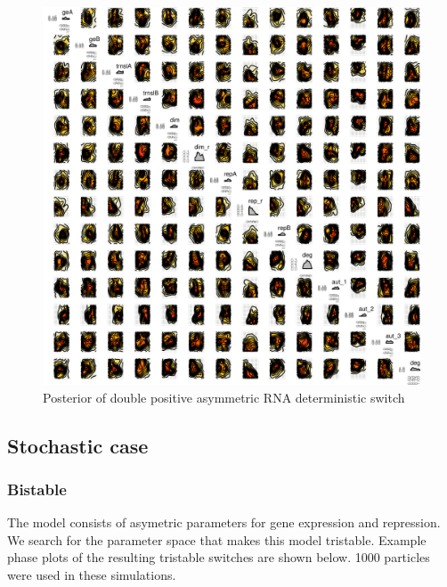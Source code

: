 \begin{figure}[htbp]
\begin{center}
\includegraphics[scale=0.15]{chapterModelling/mass_action_switches/deterministic/asym/posterior_dp_rna.png}
\caption{Posterior of double positive asymmetric RNA deterministic switch}\label{fig:asym_det_dp_rna_ma_post}
\end{center}
\end{figure}




\clearpage


\subsection{Stochastic case}
\subsubsection{Bistable} 
The model consists of asymetric parameters for gene expression and repression. We search for the parameter space that makes this model tristable. Example phase plots of the resulting tristable switches are shown below. 1000 particles were used in these simulations.


